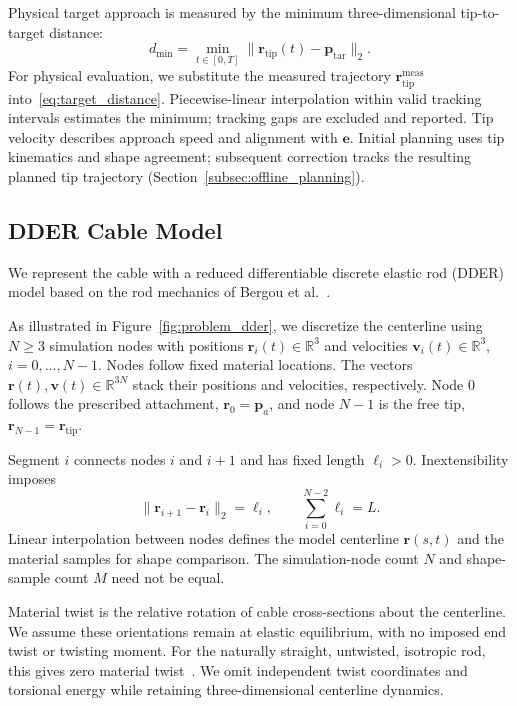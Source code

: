 \documentclass[letterpaper, 10 pt, conference]{ieeeconf}
\begin{document}
Physical target approach is measured by the minimum
three-dimensional tip-to-target distance:
\begin{equation}
d_{\min}
=\min_{t\in[0,T]}
\|\mathbf r_{\mathrm{tip}}(t)-\mathbf p_{\mathrm{tar}}\|_2.
\label{eq:target_distance}
\end{equation}
For physical evaluation, we substitute the measured trajectory
$\mathbf r_{\mathrm{tip}}^{\mathrm{meas}}$ into~\eqref{eq:target_distance}.
Piecewise-linear interpolation within valid tracking intervals
estimates the minimum; tracking gaps are excluded and reported.
Tip velocity describes approach speed and alignment with
$\mathbf e$. Initial planning uses tip kinematics and shape
agreement; subsequent correction tracks the resulting planned
tip trajectory (Section~\ref{subsec:offline_planning}).

\subsection{DDER Cable Model}
\label{subsec:dder_model}

We represent the cable with a reduced differentiable discrete
elastic rod (DDER) model based on the rod mechanics of
Bergou et al.~\cite{bergou2008discrete}.

As illustrated in Figure~\ref{fig:problem_dder}, we discretize
the centerline using $N\geq3$ simulation nodes with
positions $\mathbf r_i(t)\in\mathbb R^3$ and velocities
$\mathbf v_i(t)\in\mathbb R^3$, $i=0,\ldots,N-1$.
Nodes follow fixed material locations. The vectors
$\mathbf r(t),\mathbf v(t)\in\mathbb R^{3N}$ stack their positions
and velocities, respectively.
Node $0$ follows the prescribed attachment,
$\mathbf r_0=\mathbf p_a$, and node $N-1$ is the free tip,
$\mathbf r_{N-1}=\mathbf r_{\mathrm{tip}}$.

Segment $i$ connects nodes $i$ and $i+1$ and has fixed length
$\ell_i>0$. Inextensibility imposes
\[
\|\mathbf r_{i+1}-\mathbf r_i\|_2=\ell_i,
\qquad
\sum_{i=0}^{N-2}\ell_i=L.
\]
Linear interpolation between nodes defines the model centerline
$\mathbf r(s,t)$ and the material samples for shape comparison.
The simulation-node count $N$ and shape-sample count $M$ need
not be equal.

Material twist is the relative rotation of cable cross-sections
about the centerline. We assume these orientations remain at
elastic equilibrium, with no imposed end twist or twisting moment.
For the naturally straight, untwisted, isotropic rod, this gives
zero material twist~\cite{bergou2008discrete}. We omit independent
twist coordinates and torsional energy while retaining
three-dimensional centerline dynamics.
\end{document}
